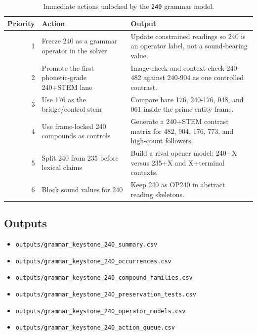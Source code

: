 \begin{table}[htbp]
\centering
\scriptsize
\begin{tabular}{rp{}p{}}
\toprule
\textbf{Priority} & \textbf{Action} & \textbf{Output} \\
\midrule
1 & Freeze 240 as a grammar operator in the solver & Update constrained readings so 240 is an operator label, not a sound-bearing value. \\
2 & Promote the first phonetic-grade 240+STEM lane & Image-check and context-check 240-482 against 240-904 as one controlled contrast. \\
3 & Use 176 as the bridge/control stem & Compare bare 176, 240-176, 048, and 061 inside the prime entity frame. \\
4 & Use frame-locked 240 compounds as controls & Generate a 240+STEM contrast matrix for 482, 904, 176, 773, and high-count followers. \\
5 & Split 240 from 235 before lexical claims & Build a rival-opener model: 240+X versus 235+X and X+terminal contexts. \\
6 & Block sound values for 240 & Keep 240 as OP240 in abstract reading skeletons. \\
\bottomrule
\end{tabular}
\caption{Immediate actions unlocked by the \texttt{240} grammar model.}
\label{tab:grammar-keystone-240-actions}
\end{table}

\subsection{Outputs}

\begin{itemize}
  \item \texttt{outputs/grammar\_keystone\_240\_summary.csv}
  \item \texttt{outputs/grammar\_keystone\_240\_occurrences.csv}
  \item \texttt{outputs/grammar\_keystone\_240\_compound\_families.csv}
  \item \texttt{outputs/grammar\_keystone\_240\_preservation\_tests.csv}
  \item \texttt{outputs/grammar\_keystone\_240\_operator\_models.csv}
  \item \texttt{outputs/grammar\_keystone\_240\_action\_queue.csv}
\end{itemize}
